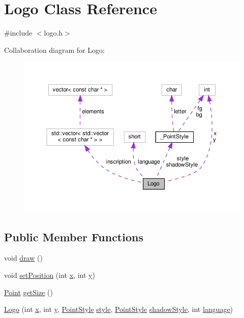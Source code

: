 \hypertarget{class_logo}{}\section{Logo Class Reference}
\label{class_logo}


{\ttfamily \#include $<$logo.\+h$>$}



Collaboration diagram for Logo\+:
\nopagebreak
\begin{figure}[H]
\begin{center}
\leavevmode
\includegraphics[width=350pt]{class_logo__coll__graph}
\end{center}
\end{figure}
\subsection*{Public Member Functions}
\begin{DoxyCompactItemize}
\item 
void \mbox{\hyperlink{class_logo_aced3f5817a709bcc0fd7cf8a360a2523}{draw}} ()
\item 
void \mbox{\hyperlink{class_logo_a048b9474c23e659c94f590509376f198}{set\+Position}} (int \mbox{\hyperlink{class_logo_ab25a813d9b3635c4b524dab9bc2ee86e}{x}}, int \mbox{\hyperlink{class_logo_a33846b1b3ac0da8180c888fb9a1680f6}{y}})
\item 
\mbox{\hyperlink{common_8h_aa9cfdb80b4ca12013a2de8a3b9b97981}{Point}} \mbox{\hyperlink{class_logo_aeeefce0ee601c896c38b929b7a355616}{get\+Size}} ()
\item 
\mbox{\hyperlink{class_logo_a1cdb59eff67441b73e9d0450e6a88921}{Logo}} (int \mbox{\hyperlink{class_logo_ab25a813d9b3635c4b524dab9bc2ee86e}{x}}, int \mbox{\hyperlink{class_logo_a33846b1b3ac0da8180c888fb9a1680f6}{y}}, \mbox{\hyperlink{common_8h_afd9cb36d6ef309c77ea1e3177e19c623}{Point\+Style}} \mbox{\hyperlink{class_logo_a2a0115dd4566f475c108eb3728265b62}{style}}, \mbox{\hyperlink{common_8h_afd9cb36d6ef309c77ea1e3177e19c623}{Point\+Style}} \mbox{\hyperlink{class_logo_a73d851ecd0cf3b7513f47df2aa462142}{shadow\+Style}}, int \mbox{\hyperlink{class_logo_ac3f13aa3fd16b904a71157e6ff47e48e}{language}})
\end{DoxyCompactItemize}

